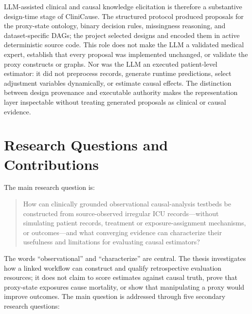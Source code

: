 LLM-assisted clinical and causal knowledge elicitation is therefore a substantive design-time stage of CliniCause.  The structured protocol produced proposals for the proxy-state ontology, binary decision rules, missingness reasoning, and dataset-specific DAGs; the project selected designs and encoded them in active deterministic source code.  This role does not make the LLM a validated medical expert, establish that every proposal was implemented unchanged, or validate the proxy constructs or graphs.  Nor was the LLM an executed patient-level estimator: it did not preprocess records, generate runtime predictions, select adjustment variables dynamically, or estimate causal effects.  The distinction between design provenance and executable authority makes the representation layer inspectable without treating generated proposals as clinical or causal evidence.

\section{Research Questions and Contributions}
\label{sec:introduction:research-questions-contributions}

The main research question is:

\begin{quote}
How can clinically grounded observational causal-analysis testbeds be constructed from source-observed irregular ICU records---without simulating patient records, treatment or exposure-assignment mechanisms, or outcomes---and what converging evidence can characterize their usefulness and limitations for evaluating causal estimators?
\end{quote}

The words ``observational'' and ``characterize'' are central.  The thesis investigates how a linked workflow can construct and qualify retrospective evaluation resources; it does not claim to score estimates against causal truth, prove that proxy-state exposures cause mortality, or show that manipulating a proxy would improve outcomes.  The main question is addressed through five secondary research questions:

